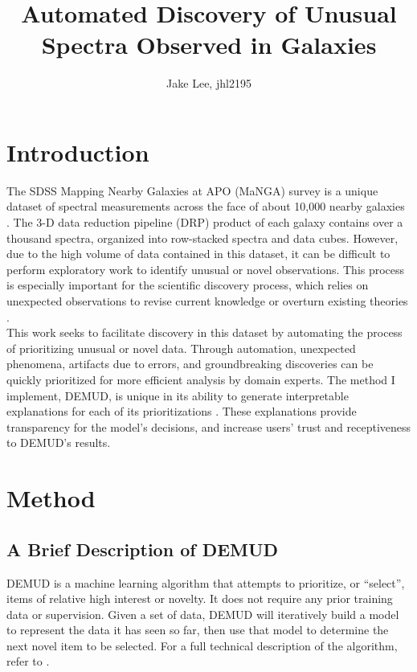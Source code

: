 \documentclass[10pt, letterpaper, notitlepage]{article}
\begin{document}
\title{Automated Discovery of Unusual Spectra Observed in Galaxies}
\author{Jake Lee, jhl2195}
\maketitle

\section{Introduction}

The SDSS Mapping Nearby Galaxies at APO (MaNGA) survey is a unique dataset of spectral
measurements across the face of about 10,000 nearby galaxies \citep{2015ApJ...798....7B}.
The 3-D data reduction pipeline (DRP) product of each galaxy contains over a thousand spectra,
organized into row-stacked spectra and data cubes. However, due to the high
volume of data contained in this dataset, it can be difficult to perform exploratory work
to identify unusual or novel observations. This process is especially important for the
scientific discovery process, which relies on unexpected observations to revise current
knowledge or overturn existing theories \citep{kuhn2012structure}.\\

This work seeks to facilitate discovery in this dataset by automating the process of
prioritizing unusual or novel data. Through automation, unexpected phenomena, artifacts
due to errors, and groundbreaking discoveries can be quickly prioritized for more efficient
analysis by domain experts. The method I implement, DEMUD, is unique in its ability to
generate interpretable explanations for each of its prioritizations \citep{wagstaff2013guiding}.
These explanations provide transparency for the model's decisions, and increase users'
trust and receptiveness to DEMUD's results.

\section{Method}

\subsection{A Brief Description of DEMUD}

DEMUD is a machine learning algorithm that attempts to prioritize, or ``select'', items
of relative high interest or novelty. It does not require any prior training data or
supervision. Given a set of data, DEMUD will iteratively build a model to represent the
data it has seen so far, then use that model to determine the next novel item to be selected.
For a full technical description of the algorithm, refer to \cite{wagstaff2013guiding}.\\
\end{document}
